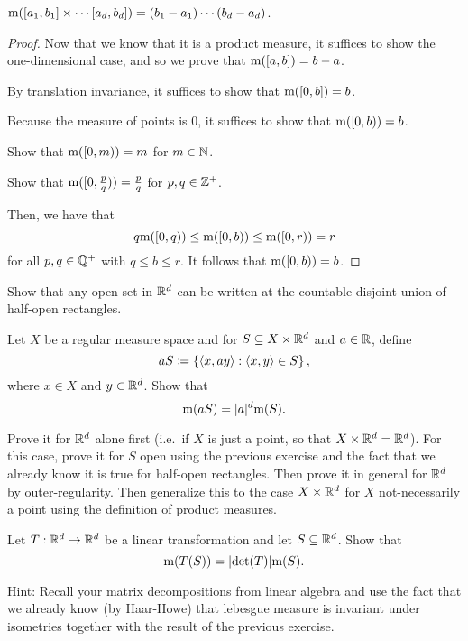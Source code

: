 \begin{prp}
$\mathrm{m} ([a_1,b_1]\times \cdots [a_d,b_d])=(b_1-a_1)\cdots (b_d-a_d)$.
\begin{proof}
Now that we know that it is a product measure, it suffices to show the one-dimensional case, and so we prove that $\mathrm{m} ([a,b])=b-a$.

By translation invariance, it suffices to show that $\mathrm{m} ([0,b])=b$.

Because the measure of points is $0$, it suffices to show that $\mathrm{m} ([0,b))=b$.

\begin{exr}
Show that $\mathrm{m} ([0,m))=m$ for $m\in \mathbb{N}$.
\end{exr}
\begin{exr}
Show that $\mathrm{m} ([0,\frac{p}{q}))=\frac{p}{q}$ for $p,q\in \mathbb{Z} ^+$.
\end{exr}
Then, we have that
\begin{equation}
q\mathrm{m} ([0,q)) \leq \mathrm{m} ([0,b))\leq \mathrm{m} ([0,r))=r
\end{equation}
for all $p,q\in \mathbb{Q} ^+$ with $q\leq b\leq r$.  It follows that $\mathrm{m} ([0,b))=b$.
\end{proof}
\end{prp}
\begin{exr}
Show that any open set in $\mathbb{R} ^d$ can be written at the countable disjoint union of half-open rectangles.
\end{exr}
\begin{exr}\label{exr5.2.28}
Let $X$ be a regular measure space and for $S\subseteq X\times \mathbb{R} ^d$ and $a\in \mathbb{R}$, define
\begin{equation}
aS\coloneqq \left\{ \langle x,ay\rangle:\langle x,y\rangle\in S\right\} ,
\end{equation}
where $x\in X$ and $y\in \mathbb{R} ^d$.  Show that
\begin{equation}
\mathrm{m} (aS)=\lvert a\rvert^d\mathrm{m} (S).
\end{equation}
\begin{rmk}
Prove it for $\mathbb{R} ^d$ alone first (i.e.~if $X$ is just a point, so that $X\times \mathbb{R} ^d=\mathbb{R} ^d$).  For this case, prove it for $S$ open using the previous exercise and the fact that we already know it is true for half-open rectangles.  Then prove it in general for $\mathbb{R} ^d$ by outer-regularity.  Then generalize this to the case $X\times \mathbb{R} ^d$ for $X$ not-necessarily a point using the definition of product measures.
\end{rmk}
\end{exr}
\begin{exr}
Let $T:\mathbb{R} ^d\rightarrow \mathbb{R} ^d$ be a linear transformation and let $S\subseteq \mathbb{R} ^d$.  Show that
\begin{equation}
\mathrm{m} (T(S))=\lvert\det (T)\rvert\mathrm{m} (S).
\end{equation}
\begin{rmk}
Hint:  Recall your matrix decompositions from linear algebra and use the fact that we already know (by Haar-Howe) that lebesgue measure is invariant under isometries together with the result of the previous exercise.
\end{rmk}
\end{exr}
